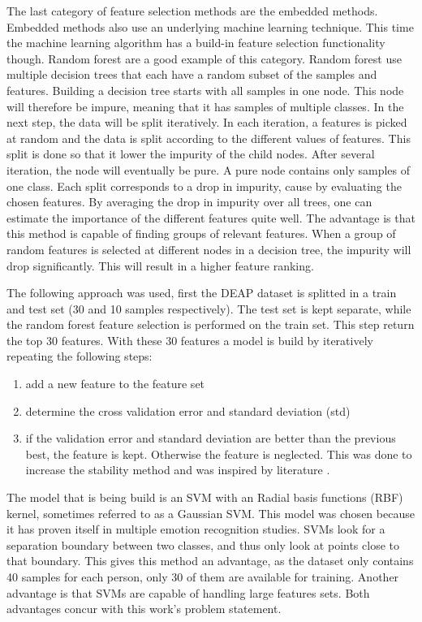 \documentclass[12pt,journal,compsoc]{IEEEtran}
\newcommand{\npar}{\par \vspace{2.3ex plus 0.3ex minus 0.3ex}}
\begin{document}
\npar

The last category of feature selection methods are the embedded methods. Embedded methods also use an underlying machine learning technique. This time the machine learning algorithm has a build-in feature selection functionality though. Random forest are a good example of this category. Random forest use multiple decision trees that each have a random subset of the samples and features\citep{rfPaper}. Building a decision tree starts with all samples in one node. This node will therefore be impure, meaning that it has samples of multiple classes. In the next step, the data will be split iteratively. In each iteration, a features is picked at random and the data is split according to the different values of features. This split is done so that it lower the impurity of the child nodes. After several iteration, the node will eventually be pure. A pure node contains only samples of one class. Each split corresponds to a drop in impurity, cause by evaluating the chosen features. By averaging the drop in impurity over all trees, one can estimate the importance of the different features quite well. The advantage is that this method is capable of finding groups of relevant features. When a group of random features is selected at different nodes in a decision tree, the impurity will drop significantly. This will result in a higher feature ranking.

\npar

The following approach was used, first the DEAP dataset is splitted in a train and test set (30 and 10 samples respectively). The test set is kept separate, while the random forest feature selection is performed on the train set. This step return the top 30 features. With these 30 features a model is build by iteratively repeating the following steps:
\begin{enumerate}
\item add a new feature to the feature set
\item determine the cross validation error and standard deviation (std)
\item if the validation error and standard deviation are better than the previous best, the feature is kept. Otherwise the feature is neglected. This was done to increase the stability method and was inspired by literature \citep{rfPaper}.
\end{enumerate}
The model that is being build is an SVM with an Radial basis functions (RBF) kernel, sometimes referred to as a Gaussian SVM. This model was chosen because it has proven itself in multiple emotion recognition studies\citep{killyPaper,emorecoghard,SVMUsage,SVMUsage2}. SVMs look for a separation boundary between two classes, and thus only look at points close to that boundary. This gives this method an advantage, as the dataset only contains 40 samples for each person, only 30 of them are available for training. Another advantage is that SVMs are capable of handling large features sets\citep{SVMLargeFeatSets,SVMLargeFeatSets2}. Both advantages concur with this work's problem statement. 
\end{document}

